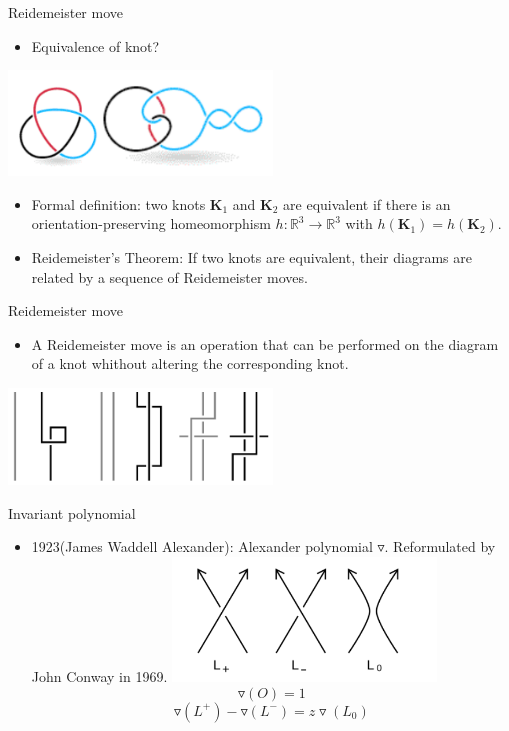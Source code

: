 \begin{frame}{Reidemeister move}
\begin{itemize}
    \item Equivalence of knot?
\end{itemize}
\centering
\includegraphics[width=7cm]{Pictures/equivalence.png}

\begin{itemize}
    \item Formal definition: two knots $\mathbf{K}_1$ and $\mathbf{K}_2$ are equivalent if there is an orientation-preserving homeomorphism $h:\mathbb{R}^3 \rightarrow \mathbb{R}^3$ with $h(\mathbf{K}_1) = h(\mathbf{K}_2)$.
\end{itemize}

\begin{itemize}
    \item Reidemeister's Theorem: If two knots are equivalent, their diagrams are related by a sequence of Reidemeister moves.
\end{itemize}
\end{frame}

\begin{frame}{Reidemeister move}
\begin{itemize}
    \item A Reidemeister move is an operation that can be performed on the diagram
of a knot whithout altering the corresponding knot.
\end{itemize}
\centering
\includegraphics[width=7cm]{Pictures/r.png}
\end{frame}

\begin{frame}{Invariant polynomial}
    \begin{itemize}
        \item 1923(James Waddell Alexander): Alexander polynomial $\triangledown$. Reformulated by John Conway in 1969.
\centering
\includegraphics[width =7cm]{Pictures/L.png}
        $$\triangledown(O) = 1$$
        $$\triangledown(L^+) - \triangledown(L^-) = z\triangledown(L_0)$$
    \end{itemize}
\end{frame}

